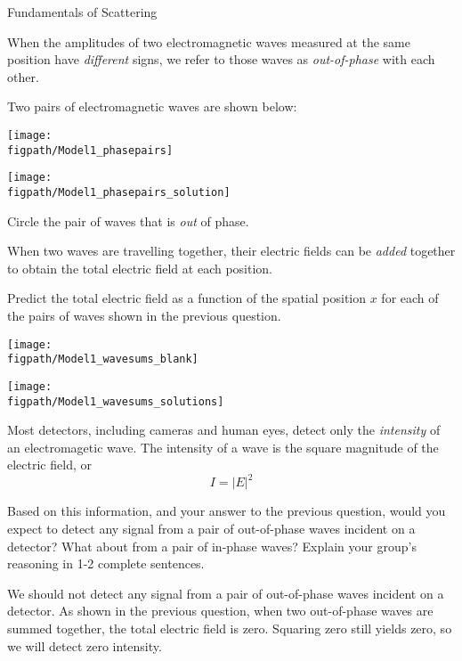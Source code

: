 \begin{activity}{Fundamentals of Scattering}
\begin{infobox}
	When the amplitudes of two electromagnetic waves measured at the same position have \emph{different} signs, we refer to those waves as \emph{out-of-phase} with each other.
\end{infobox}

\begin{ctqs}

	\question Two pairs of electromagnetic waves are shown below:
	
		\vspace{6pt}
		\begin{solution}[1.5in]{
			\centerline{\texttt{[image: \\figpath/Model1\_phasepairs]}}
		}
			\centerline{\texttt{[image: \\figpath/Model1\_phasepairs\_solution]}}
		\end{solution}
		
		Circle the pair of waves that is \emph{out} of phase.
		
	\question When two waves are travelling together, their electric fields can be \emph{added} together to obtain the total electric field at each position.
	
		Predict the total electric field as a function of the spatial position $x$ for each of the pairs of waves shown in the previous question.
		
		\begin{solution}[1in]{
			\centerline{\texttt{[image: \\figpath/Model1\_wavesums\_blank]}}
		}
			\centerline{\texttt{[image: \\figpath/Model1\_wavesums\_solutions]}}
		\end{solution}
		
	\question Most detectors, including cameras and human eyes, detect only the \emph{intensity} of an electromagetic wave.  The intensity of a wave is the square magnitude of the electric field, or
	\begin{equation*}
		I = |E|^2
	\end{equation*}
	
		Based on this information, and your answer to the previous question, would you expect to detect any signal from a pair of out-of-phase waves incident on a detector?  What about from a pair of in-phase waves?  Explain your group's reasoning in 1-2 complete sentences.
		
		\begin{solution}[2in]{}
			We should not detect any signal from a pair of out-of-phase waves incident on a detector.  As shown in the previous question, when two out-of-phase waves are summed together, the total electric field is zero.  Squaring zero still yields zero, so we will detect zero intensity.
			

\end{solution}
\end{ctqs}
\end{activity}
